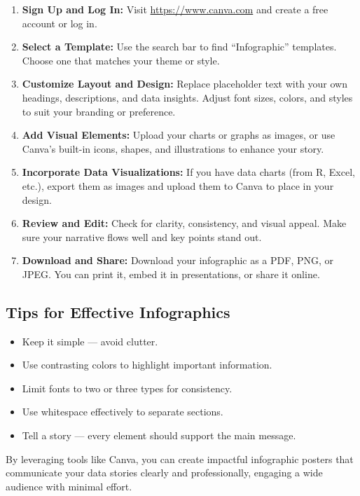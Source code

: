 \begin{enumerate}
    \item \textbf{Sign Up and Log In:} Visit \url{https://www.canva.com} and create a free account or log in.
    \item \textbf{Select a Template:} Use the search bar to find ``Infographic'' templates. Choose one that matches your theme or style.
    \item \textbf{Customize Layout and Design:} Replace placeholder text with your own headings, descriptions, and data insights. Adjust font sizes, colors, and styles to suit your branding or preference.
    \item \textbf{Add Visual Elements:} Upload your charts or graphs as images, or use Canva’s built-in icons, shapes, and illustrations to enhance your story.
    \item \textbf{Incorporate Data Visualizations:} If you have data charts (from R, Excel, etc.), export them as images and upload them to Canva to place in your design.
    \item \textbf{Review and Edit:} Check for clarity, consistency, and visual appeal. Make sure your narrative flows well and key points stand out.
    \item \textbf{Download and Share:} Download your infographic as a PDF, PNG, or JPEG. You can print it, embed it in presentations, or share it online.
\end{enumerate}

\subsection*{Tips for Effective Infographics}

\begin{itemize}
    \item Keep it simple — avoid clutter.
    \item Use contrasting colors to highlight important information.
    \item Limit fonts to two or three types for consistency.
    \item Use whitespace effectively to separate sections.
    \item Tell a story — every element should support the main message.
\end{itemize}

By leveraging tools like Canva, you can create impactful infographic posters that communicate your data stories clearly and professionally, engaging a wide audience with minimal effort.

